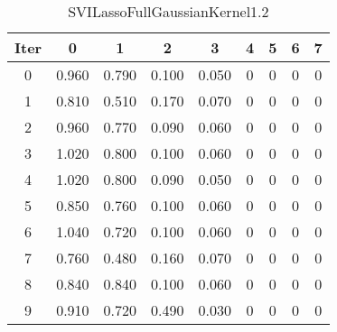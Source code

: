 \begin{table}
	\begin{center}
		\begin{tabular}{|c|c|c|c|c|c|c|c|c|}
			\hline
			Iter & 0 & 1 & 2 & 3 & 4 & 5 & 6 & 7 \\
			\hline
			0 & 0.960 & 0.790 & 0.100 & 0.050 & 0 & 0 & 0 & 0 \\
			\hline
			1 & 0.810 & 0.510 & 0.170 & 0.070 & 0 & 0 & 0 & 0 \\
			\hline
			2 & 0.960 & 0.770 & 0.090 & 0.060 & 0 & 0 & 0 & 0 \\
			\hline
			3 & 1.020 & 0.800 & 0.100 & 0.060 & 0 & 0 & 0 & 0 \\
			\hline
			4 & 1.020 & 0.800 & 0.090 & 0.050 & 0 & 0 & 0 & 0 \\
			\hline
			5 & 0.850 & 0.760 & 0.100 & 0.060 & 0 & 0 & 0 & 0 \\
			\hline
			6 & 1.040 & 0.720 & 0.100 & 0.060 & 0 & 0 & 0 & 0 \\
			\hline
			7 & 0.760 & 0.480 & 0.160 & 0.070 & 0 & 0 & 0 & 0 \\
			\hline
			8 & 0.840 & 0.840 & 0.100 & 0.060 & 0 & 0 & 0 & 0 \\
			\hline
			9 & 0.910 & 0.720 & 0.490 & 0.030 & 0 & 0 & 0 & 0 \\
			\hline
		\end{tabular}
	\end{center}
	\caption{SVILassoFullGaussianKernel1.2}
\end{table}